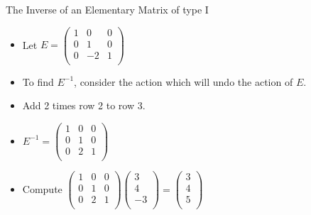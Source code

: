 \documentclass{beamer}
\begin{document}
\begin{frame}{The Inverse of an Elementary Matrix of type I}

\begin{itemize}
\item Let $E=
\begin{pmatrix}
1 & 0 & 0 \\
0 & 1 & 0 \\
0 & -2 & 1 \\
\end{pmatrix}
$
\item To find $E^{-1}$, consider the action which will undo the action
of $E$.
\item Add 2 times row 2 to row 3.
\item $E^{-1}=
\begin{pmatrix}
1 & 0 & 0 \\
0 & 1 & 0 \\
0 & 2 & 1 \\
\end{pmatrix}
$
\item Compute $
\begin{pmatrix}
1 & 0 & 0 \\
0 & 1 & 0 \\
0 & 2 & 1 \\
\end{pmatrix}
\begin{pmatrix}
3 \\
4 \\
-3  \\
\end{pmatrix}
=
\begin{pmatrix}
3 \\
4 \\
5 \\
\end{pmatrix}
$
\end{itemize}
\end{frame}
\end{document}
